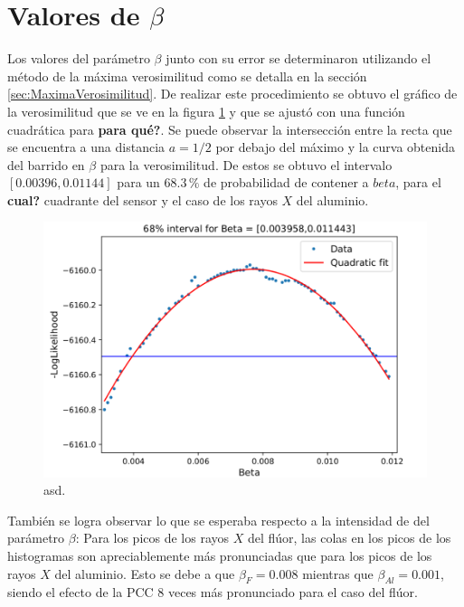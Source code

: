 \section{Valores de \texorpdfstring{$\beta$}{beta}}
\noindent Los valores del parámetro $\beta$ junto con su error se determinaron utilizando el método de la máxima verosimilitud como se detalla en la sección \ref{sec:MaximaVerosimilitud}. De realizar este procedimiento se obtuvo el gráfico de la verosimilitud que se ve en la figura \ref{fig:LL_beta} y que se ajustó con una función cuadrática para \textbf{para qué?}. Se puede observar la intersección entre la recta que se encuentra a una distancia $a=1/2$ por debajo del máximo y la curva obtenida del barrido en $\beta$ para la verosimilitud. De estos se obtuvo el intervalo $[0.00396, 0.01144]$ para un $68.3\,\%$ de probabilidad de contener a $beta$, para el \textbf{cual?} cuadrante del sensor y el caso de los rayos $X$ del aluminio.
\begin{figure}[H]
    \centering
        \includegraphics[scale=0.4]{pngs/LL_beta.png}
    \caption{\footnotesize{asd.}}
    \label{fig:LL_beta}
\end{figure}
También se logra observar lo que se esperaba respecto a la intensidad de del parámetro $\beta$: Para los picos de los rayos $X$ del flúor, las colas en los picos de los histogramas son apreciablemente más pronunciadas que para los picos de los rayos $X$ del aluminio. Esto se debe a que $\beta_{F} = 0.008$ mientras que $\beta_{Al} = 0.001$, siendo el efecto de la PCC 8 veces más pronunciado para el caso del flúor.